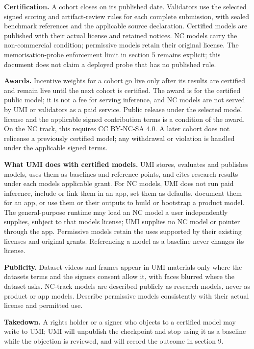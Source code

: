 \documentclass[10pt,a4paper]{article}
\begin{document}
\textbf{Certification.} A cohort closes on its published date.
Validators use the selected signed scoring and artifact-review rules for
each complete submission, with sealed benchmark references and the
applicable source declaration. Certified models are published with their
actual license and retained notices. NC models carry the non-commercial
condition; permissive models retain their original license. The
memorisation-probe enforcement limit in section 5 remains explicit; this
document does not claim a deployed probe that has no published rule.

\textbf{Awards.} Incentive weights for a cohort go live only after its
results are certified and remain live until the next cohort is
certified. The award is for the certified public model; it is not a fee
for serving inference, and NC models are not served by UMI or validators
as a paid service. Public release under the selected model license and
the applicable signed contribution terms is a condition of the award. On
the NC track, this requires CC BY-NC-SA 4.0. A later cohort does not
relicense a previously certified model; any withdrawal or violation is
handled under the applicable signed terms.

\textbf{What UMI does with certified models.} UMI stores, evaluates and
publishes models, uses them as baselines and reference points, and cites
research results under each model\textquotesingle s applicable grant.
For NC models, UMI does not run paid inference, include or link them in
an app, set them as defaults, document them for an app, or use them or
their outputs to build or bootstrap a product model. The general-purpose
runtime may load an NC model a user independently supplies, subject to
that model\textquotesingle s license; UMI supplies no NC model or
pointer through the app. Permissive models retain the uses supported by
their existing licenses and original grants. Referencing a model as a
baseline never changes its license.

\textbf{Publicity.} Dataset videos and frames appear in UMI materials
only where the dataset\textquotesingle s terms and the
signers\textquotesingle{} consent allow it, with faces blurred where the
dataset asks. NC-track models are described publicly as research models,
never as product or app models. Describe permissive models consistently
with their actual license and permitted use.

\textbf{Takedown.} A rights holder or a signer who objects to a
certified model may write to UMI; UMI will unpublish the checkpoint and
stop using it as a baseline while the objection is reviewed, and will
record the outcome in section 9.
\end{document}
